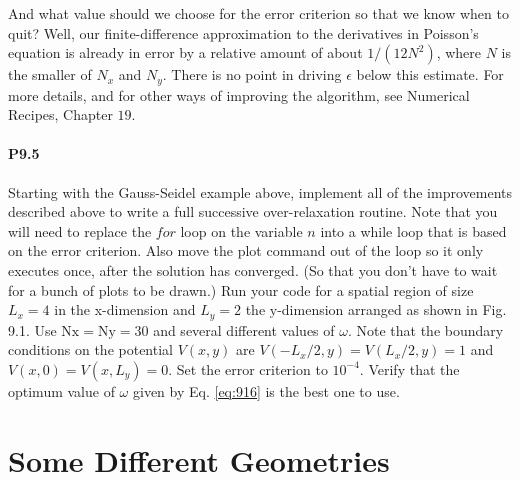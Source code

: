 And what value should we choose for the error criterion so that we know when to quit? Well, our finite-difference approximation to the derivatives in Poisson\rq s equation is already in error by a relative amount of about $1 /\left(12 N^{2}\right)$, where $N$ is the smaller of $N_{x}$ and $N_{y}$. There is no point in driving $\epsilon$ below this estimate. For more details, and for other ways of improving the algorithm, see Numerical Recipes, Chapter $19 .$

\paragraph*{P9.5}
Starting with the Gauss-Seidel example above, implement all of the improvements described above to write a full successive over-relaxation routine. Note that you will need to replace the $for$ loop on the variable $n$ into a while loop that is based on the error criterion. Also move the plot command out of the loop so it only executes once, after the solution has converged. (So that you don\rq t have to wait for a bunch of plots to be drawn.) Run your code for a spatial region of size $L_{x}=4$ in the x-dimension and $L_{y}=2$ the $\mathrm{y}$-dimension arranged as shown in Fig. 9.1. Use $\mathrm{Nx}=\mathrm{Ny}=30$ and several different values of $\omega$. Note that the boundary conditions on the potential $V(x, y)$ are $V\left(-L_{x} / 2, y\right)=V\left(L_{x} / 2, y\right)=1$ and $V(x, 0)=V\left(x, L_{y}\right)=0$. Set the error criterion to $10^{-4}$. Verify that the optimum value of $\omega$ given by Eq. \eqref{eq:916} is the best one to use.


\section*{Some Different Geometries}
